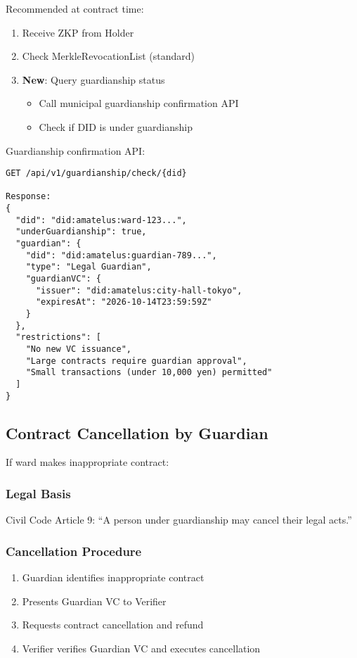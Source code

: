 Recommended at contract time:

\begin{enumerate}
  \item Receive ZKP from Holder
  \item Check MerkleRevocationList (standard)
  \item \textbf{New}: Query guardianship status
    \begin{itemize}
      \item Call municipal guardianship confirmation API
      \item Check if DID is under guardianship
    \end{itemize}
\end{enumerate}

Guardianship confirmation API:

\begin{verbatim}
GET /api/v1/guardianship/check/{did}

Response:
{
  "did": "did:amatelus:ward-123...",
  "underGuardianship": true,
  "guardian": {
    "did": "did:amatelus:guardian-789...",
    "type": "Legal Guardian",
    "guardianVC": {
      "issuer": "did:amatelus:city-hall-tokyo",
      "expiresAt": "2026-10-14T23:59:59Z"
    }
  },
  "restrictions": [
    "No new VC issuance",
    "Large contracts require guardian approval",
    "Small transactions (under 10,000 yen) permitted"
  ]
}
\end{verbatim}

\subsection{Contract Cancellation by Guardian}

If ward makes inappropriate contract:

\subsubsection{Legal Basis}

Civil Code Article 9: ``A person under guardianship may cancel their legal acts.''

\subsubsection{Cancellation Procedure}

\begin{enumerate}
  \item Guardian identifies inappropriate contract
  \item Presents Guardian VC to Verifier
  \item Requests contract cancellation and refund
  \item Verifier verifies Guardian VC and executes cancellation
\end{enumerate}

